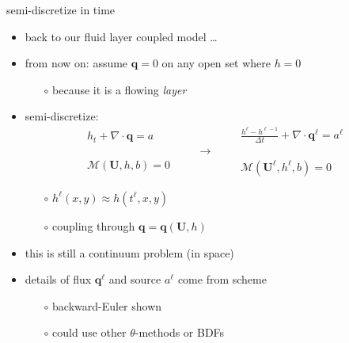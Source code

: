 \documentclass[xcolor={dvipsnames}]{beamer}
\newcommand\bq{\mathbf{q}}
\newcommand\bU{\mathbf{U}}
\newcommand\Div{\nabla\cdot}
\begin{document}
\newcommand{\singletsmc}{\frac{h^\ell - h^{\ell-1}}{\Delta t} + \Div \bq^\ell = a^\ell}


\begin{frame}{semi-discretize in time}

\begin{itemize}
\item back to our fluid layer coupled model \dots
\item from now on: assume $\bq=0$ on any open set where $h=0$
    \begin{itemize}
    \item[$\circ$] because it is a flowing \emph{layer}
    \end{itemize}
\item semi-discretize:
$$\begin{matrix}
 h_t + \Div\bq = a \\
 \phantom{foo} \\
 \mathcal{M}(\bU,h,b) = 0
\end{matrix} \qquad \to \qquad \begin{matrix}
 \singletsmc \\
 \phantom{foo} \\
 \mathcal{M}(\bU^\ell,h^\ell,b) = 0
\end{matrix}$$
        \begin{itemize}
        \item[$\circ$] $h^\ell(x,y) \approx h(t^\ell,x,y)$
        \item[$\circ$] coupling through $\bq=\bq(\bU,h)$
        \end{itemize}
\item this is still a continuum problem (in space)
\item details of flux $\bq^\ell$ and source $a^\ell$ come from scheme
        \begin{itemize}
        \item[$\circ$] backward-Euler shown
        \item[$\circ$] could use other $\theta$-methods or BDFs
        \end{itemize}
\end{itemize}
\end{frame}
\end{document}
